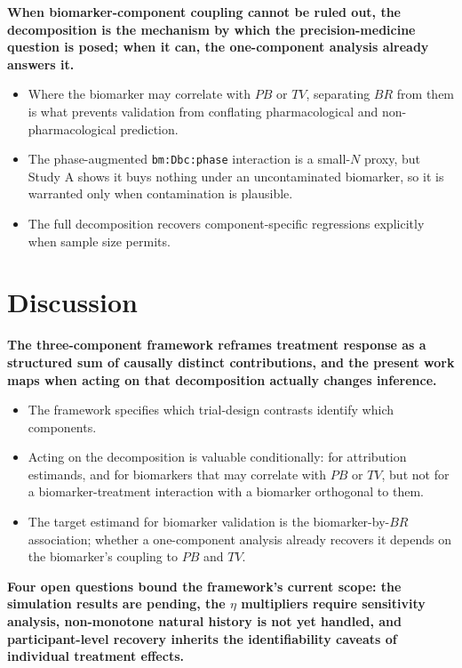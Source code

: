 \documentclass[
  11pt,
]{article}
\begin{document}
\textbf{When biomarker-component coupling cannot be ruled out, the decomposition is the mechanism by which the precision-medicine question is posed; when it can, the one-component analysis already answers it.}

\begin{itemize}\setlength{\itemsep}{2pt}\setlength{\parskip}{0pt}
\item Where the biomarker may correlate with $PB$ or $TV$, separating $BR$ from them is what prevents validation from conflating pharmacological and non-pharmacological prediction.
\item The phase-augmented \texttt{bm:Dbc:phase} interaction is a small-$N$ proxy, but Study A shows it buys nothing under an uncontaminated biomarker, so it is warranted only when contamination is plausible.
\item The full decomposition recovers component-specific regressions explicitly when sample size permits.
\end{itemize}

\section{Discussion}\label{discussion}

\textbf{The three-component framework reframes treatment response as a structured sum of causally distinct contributions, and the present work maps when acting on that decomposition actually changes inference.}

\begin{itemize}\setlength{\itemsep}{2pt}\setlength{\parskip}{0pt}
\item The framework specifies which trial-design contrasts identify which components.
\item Acting on the decomposition is valuable conditionally: for attribution estimands, and for biomarkers that may correlate with $PB$ or $TV$, but not for a biomarker-treatment interaction with a biomarker orthogonal to them.
\item The target estimand for biomarker validation is the biomarker-by-$BR$ association; whether a one-component analysis already recovers it depends on the biomarker's coupling to $PB$ and $TV$.
\end{itemize}

\textbf{Four open questions bound the framework's current scope: the simulation results are pending, the $\eta$ multipliers require sensitivity analysis, non-monotone natural history is not yet handled, and participant-level recovery inherits the identifiability caveats of individual treatment effects.}
\end{document}
